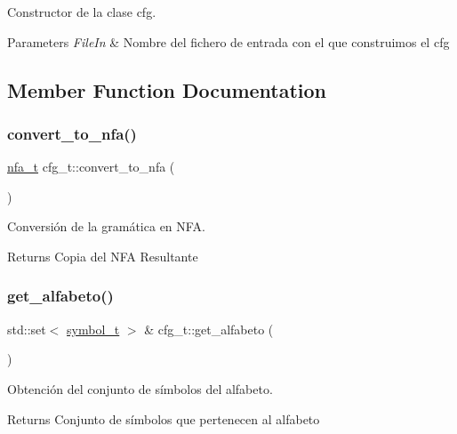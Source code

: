 Constructor de la clase cfg. 


\begin{DoxyParams}{Parameters}
{\em File\+In} & Nombre del fichero de entrada con el que construimos el cfg \\
\hline
\end{DoxyParams}


\subsection{Member Function Documentation}
\mbox{\label{classcfg__t_abda1afb6ae53b0b40a39d84176aab3b8}} 
\subsubsection{\texorpdfstring{convert\+\_\+to\+\_\+nfa()}{convert\_to\_nfa()}}
{\footnotesize\ttfamily \hyperlink{classnfa__t}{nfa\+\_\+t} cfg\+\_\+t\+::convert\+\_\+to\+\_\+nfa (\begin{DoxyParamCaption}{ }\end{DoxyParamCaption})}



Conversión de la gramática en N\+FA. 

\begin{DoxyReturn}{Returns}
Copia del N\+FA Resultante 
\end{DoxyReturn}
\mbox{\label{classcfg__t_a28aad145e2844e938e5788f6b6547d9b}} 
\subsubsection{\texorpdfstring{get\+\_\+alfabeto()}{get\_alfabeto()}}
{\footnotesize\ttfamily std\+::set$<$ \hyperlink{classsymbol__t}{symbol\+\_\+t} $>$ \& cfg\+\_\+t\+::get\+\_\+alfabeto (\begin{DoxyParamCaption}{ }\end{DoxyParamCaption})}



Obtención del conjunto de símbolos del alfabeto. 

\begin{DoxyReturn}{Returns}
Conjunto de símbolos que pertenecen al alfabeto 
\end{DoxyReturn}
\mbox{\label{classcfg__t_aff31718cb0d5f8ae65d3a53ba4065f2e}} 
